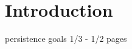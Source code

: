 

\chapter{Introduction}

\cite{microsoft-secure-windows-boot-process}
\cite{microsoft-rootkits}
\cite{veracode}
\cite{kaspersky}
persistence
goals
1/3 - 1/2 pages